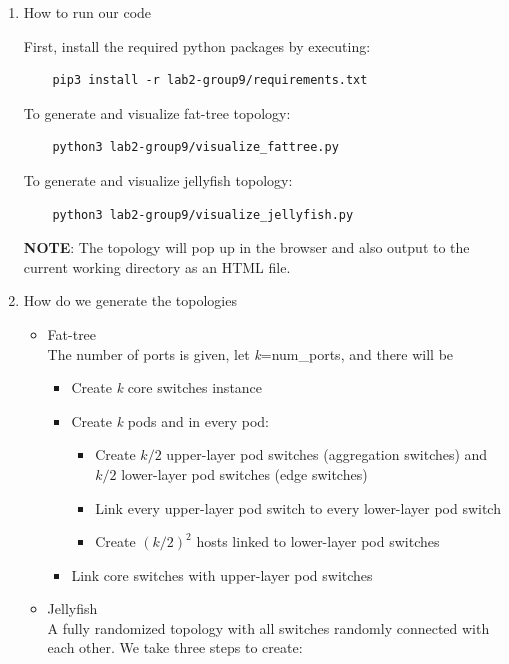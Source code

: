 \documentclass[a4paper,11pt]{article}
\begin{document}
\begin{enumerate}
    \item How to run our code
    \begin{itemize}
    First, install the required python packages by executing:
    \begin{verbatim}
    pip3 install -r lab2-group9/requirements.txt
    \end{verbatim}
    To generate and visualize fat-tree topology:
    \begin{verbatim}
    python3 lab2-group9/visualize_fattree.py
    \end{verbatim}
    To generate and visualize jellyfish topology:
    \begin{verbatim}
    python3 lab2-group9/visualize_jellyfish.py
    \end{verbatim}
    \textbf{NOTE}: The topology will pop up in the browser and also output to the current working directory as an HTML file.
    \end{itemize}
    \item How do we generate the topologies
    \begin{itemize}
        \item Fat-tree \\
        The number of ports is given, let \textit{k}=num\_ports, and there will be
        \begin{itemize}
            \item Create \textit{k} core switches instance
            \item Create \textit{k} pods and in every pod:
            \begin{itemize}
                \item Create \textit{$k/2$} upper-layer pod switches (aggregation switches) and \textit{$k/2$} lower-layer pod switches (edge switches)
                \item Link every upper-layer pod switch to every lower-layer pod switch
                \item Create \textit{$(k/2)^2$} hosts linked to lower-layer pod switches
            \end{itemize}
            \item Link core switches with upper-layer pod switches
        \end{itemize}
        \item Jellyfish \\
        A fully randomized topology with all switches randomly connected with each other. We take three steps to create:

\end{itemize}
\end{enumerate}
\end{document}
